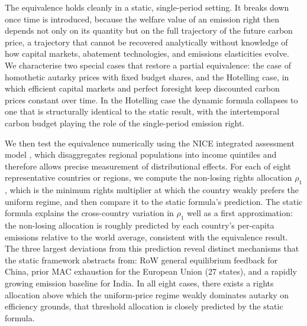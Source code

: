 \documentclass[12pt,english]{article}
\begin{document}
The equivalence holds cleanly in a static, single-period setting. It breaks down once time is introduced, because the welfare value of an emission right then depends not only on its quantity but on the full trajectory of the future carbon price, a trajectory that cannot be recovered analytically without knowledge of how capital markets, abatement technologies, and emissions elasticities evolve. We characterise two special cases that restore a partial equivalence: the case of homothetic autarky prices with fixed budget shares, and the Hotelling case, in which efficient capital markets and perfect foresight keep discounted carbon prices constant over time. In the Hotelling case the dynamic formula collapses to one that is structurally identical to the static result, with the intertemporal carbon budget playing the role of the single-period emission right. 

We then test the equivalence numerically using the NICE integrated assessment model \citep{youngbrun2025}, which disaggregates regional populations into income quintiles and therefore allows precise measurement of distributional effects. For each of eight representative countries or regions, we compute the non-losing rights allocation $\rho_1$, which is the minimum rights multiplier at which the country weakly prefers the uniform regime, and then compare it to the static formula's prediction. The static formula explains the cross-country variation in $\rho_1$ well as a first approximation: the non-losing allocation is roughly predicted by each country's per-capita emissions relative to the world average, consistent with the equivalence result. The three largest deviations from this prediction reveal distinct mechanisms that the static framework abstracts from: RoW general equilibrium feedback for China, prior MAC exhaustion for the European Union (27 states), and a rapidly growing emission baseline for India. In all eight cases, there exists a rights allocation above which the uniform-price regime weakly dominates autarky on efficiency grounds, that threshold allocation is closely predicted by the static formula.
\end{document}
